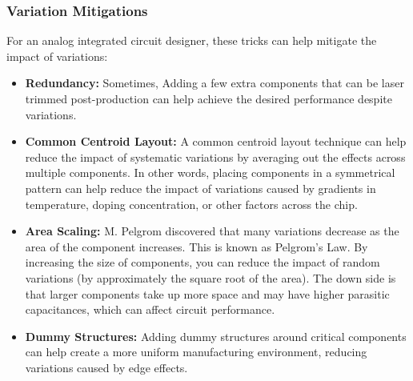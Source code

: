 \subsubsection{Variation Mitigations}
For an analog integrated circuit designer, these tricks can help
mitigate the impact of variations:
\begin{itemize}
  \item \textbf{Redundancy:} Sometimes, Adding a few extra components
    that can be laser trimmed post-production can help achieve the
    desired performance despite variations.
  \item \textbf{Common Centroid Layout:} A common centroid layout
    technique can help reduce the impact of systematic variations
    by averaging out the effects across multiple components.
    In other words, placing components in a symmetrical pattern
    can help reduce the impact of variations caused by gradients
    in temperature, doping concentration, or other factors across
    the chip.
  \item \textbf{Area Scaling:} M. Pelgrom discovered that many
    variations decrease as the area of the component increases.
    This is known as Pelgrom's Law. By increasing the size of
    components, you can reduce the impact of random variations
    (by approximately the square root of the area). The down
    side is that larger components take up more space and may
    have higher parasitic capacitances, which can affect circuit
    performance.
  \item \textbf{Dummy Structures:} Adding dummy structures around
    critical components can help create a more uniform manufacturing
    environment, reducing variations caused by edge effects.
\end{itemize}


